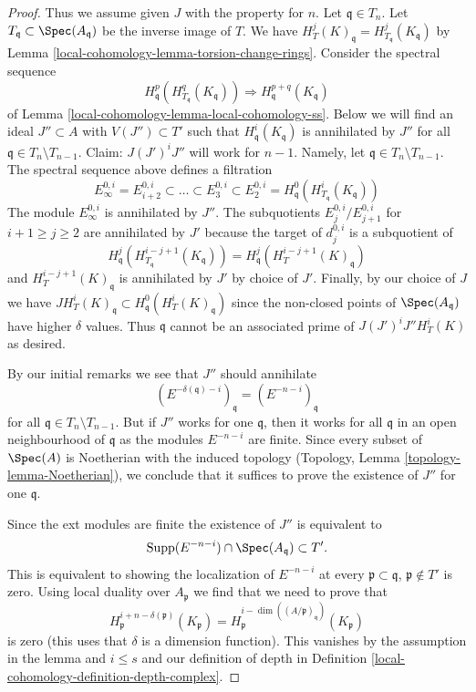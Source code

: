 \begin{proof}
\medskip\noindent
Thus we assume given $J$ with the property for $n$.
Let $\mathfrak q \in T_n$. Let $T_\mathfrak q \subset \Spec(A_\mathfrak q)$
be the inverse image of $T$. We have
$H^j_T(K)_\mathfrak q = H^j_{T_\mathfrak q}(K_\mathfrak q)$
by Lemma \ref{local-cohomology-lemma-torsion-change-rings}.
Consider the spectral sequence
$$
H_\mathfrak q^p(H^q_{T_\mathfrak q}(K_\mathfrak q))
\Rightarrow
H^{p + q}_\mathfrak q(K_\mathfrak q)
$$
of Lemma \ref{local-cohomology-lemma-local-cohomology-ss}.
Below we will find an ideal $J'' \subset A$ with $V(J'') \subset T'$
such that $H^i_\mathfrak q(K_\mathfrak q)$ is annihilated by $J''$ for all
$\mathfrak q \in T_n \setminus T_{n - 1}$.
Claim: $J (J')^i J''$ will work for $n - 1$.
Namely, let $\mathfrak q \in T_n \setminus T_{n - 1}$.
The spectral sequence above defines a filtration
$$
E_\infty^{0, i} = E_{i + 2}^{0, i} \subset \ldots \subset E_3^{0, i} \subset
E_2^{0, i} = H^0_\mathfrak q(H^i_{T_\mathfrak q}(K_\mathfrak q))
$$
The module $E_\infty^{0, i}$ is annihilated by $J''$.
The subquotients $E_j^{0, i}/E_{j + 1}^{0, i}$ for $i + 1 \geq j \geq 2$
are annihilated by $J'$ because the target of $d_j^{0, i}$
is a subquotient of
$$
H^j_\mathfrak q(H^{i - j + 1}_{T_\mathfrak q}(K_\mathfrak q)) =
H^j_\mathfrak q(H^{i - j + 1}_T(K)_\mathfrak q)
$$
and $H^{i - j + 1}_T(K)_\mathfrak q$ is annihilated by $J'$ by choice of $J'$.
Finally, by our choice of $J$ we have
$J H^i_T(K)_\mathfrak q \subset H^0_\mathfrak q(H^i_T(K)_\mathfrak q)$
since the non-closed points of $\Spec(A_\mathfrak q)$ have higher
$\delta$ values. Thus $\mathfrak q$ cannot be an associated prime of
$J(J')^iJ'' H^i_T(K)$ as desired.

\medskip\noindent
By our initial remarks we see that $J''$ should annihilate
$$
(E^{-\delta(\mathfrak q) - i})_\mathfrak q =
(E^{-n - i})_\mathfrak q
$$
for all $\mathfrak q \in T_n \setminus T_{n - 1}$.
But if $J''$ works for one $\mathfrak q$, then it works for all
$\mathfrak q$ in an open neighbourhood of $\mathfrak q$
as the modules $E^{-n - i}$ are finite.
Since every subset of $\Spec(A)$ is Noetherian with the induced
topology (Topology, Lemma \ref{topology-lemma-Noetherian}),
we conclude that it suffices
to prove the existence of $J''$ for one $\mathfrak q$.

\medskip\noindent
Since the ext modules are finite the existence of $J''$ is
equivalent to
$$
\text{Supp}(E^{-n - i}) \cap \Spec(A_\mathfrak q) \subset T'.
$$
This is equivalent to showing the localization of $E^{-n - i}$ at every
$\mathfrak p \subset \mathfrak q$, $\mathfrak p \not \in T'$
is zero. Using local duality over $A_\mathfrak p$ we find that we need
to prove that
$$
H^{i + n - \delta(\mathfrak p)}_\mathfrak p(K_\mathfrak p) =
H^{i - \dim((A/\mathfrak p)_\mathfrak q)}_\mathfrak p(K_\mathfrak p)
$$
is zero (this uses that $\delta$ is a dimension function).
This vanishes by the assumption in the lemma and $i \leq s$ and
our definition of depth in Definition \ref{local-cohomology-definition-depth-complex}.


\end{proof}
